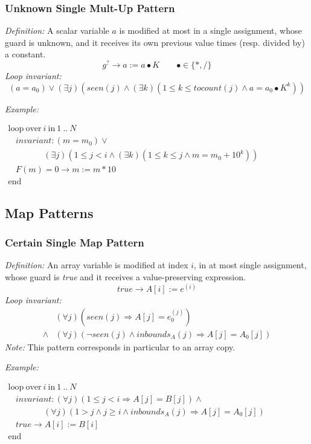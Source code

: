 \documentclass[a4paper,10pt]{article}
\newcommand{\idx}{\ensuremath{i}\xspace}
\newcommand{\at}[1]{{(#1)}}
\newcommand{\KWloop}{\ensuremath{\mathrm{loop}~}}
\newcommand{\KWend}{\ensuremath{\mathrm{end}~}}
\newcommand{\KWover}{\ensuremath{\mathrm{over}~}}
\newcommand{\KWin}{\ensuremath{~\mathrm{in}~}}
\newcommand{\impl}{\ensuremath{\Longrightarrow}}
\newcommand{\inbounds}[2]{\ensuremath{\mathit{inbounds}_{#1}(#2)}\xspace}
\newcommand{\seen}[1]{\ensuremath{\mathit{seen}(#1)}\xspace}
\newcommand{\tocount}[1]{\ensuremath{\mathit{tocount}(#1)}\xspace}
\newcommand{\loopinvariant}{\noindent\textit{Loop invariant:}\xspace}
\newcommand{\patterndef}{\noindent\textit{Definition:}\xspace}
\newcommand{\patternexample}{\noindent\textit{Example:}\xspace}
\newcommand{\patternnote}{\noindent\textit{Note:}\xspace}
\begin{document}
\subsubsection*{Unknown Single Mult-Up Pattern}

\patterndef A scalar variable $a$ is modified at most in a single assignment, whose
guard is unknown, and it receives its own previous value times
(resp. divided by) a constant.
%
$$g^? \rightarrow a := a \bullet K  \qquad \bullet \in \{*, / \}$$
%
\loopinvariant
%
$$(a = a_0) \lor (\exists j)(\seen{j} \land (\exists k)(1 \leq k \leq \tocount{j} \land a = a_0 \bullet K^k))$$

\bigskip
\patternexample

\medskip
$\begin{array}{l}
  \KWloop \KWover i \KWin 1~..~N \\
  ~~~~ \textit{invariant}: (m = m_0) \lor \\
  ~~~~~~~~~~~~~~~~~~~ (\exists j)(1 \leq j < i \land (\exists k)(1 \leq k \leq j \land m = m_0+10^k))\\
  ~~~~ F(m)=0 \rightarrow m := m*10\\
  \KWend
\end{array}$

\subsection{Map Patterns}

\subsubsection*{Certain Single Map Pattern}

\patterndef An array variable is modified at index \idx, in at most single assignment, whose
guard is \textit{true} and it receives a value-preserving expression.
%
$$\mathit{true} \rightarrow A[\idx] := e^\at{\idx}$$
%
\loopinvariant
%
\begin{eqnarray*}
&(\forall j)(\seen{j} \impl A[j] = e_0^\at{j}) \\
\land& (\forall j)(\neg \seen{j} \land \inbounds{A}{j} \impl A[j] = A_0[j])
\end{eqnarray*}
%
\patternnote This pattern corresponds in particular to an array copy.

\bigskip
\patternexample

\medskip
$\begin{array}{l}
  \KWloop \KWover i \KWin 1~..~N \\
  ~~~~ \textit{invariant}: (\forall j)(1\leq j< i \impl A[j] = B[j]) \land\\
  ~~~~~~~~~~~~~~~~~~~ (\forall j)(1 > j \land j \geq i \land \inbounds{A}{j} \impl A[j] = A_0[j])\\
  ~~~~ true \rightarrow A[i] := B[i]\\
  \KWend
\end{array}$
\end{document}

